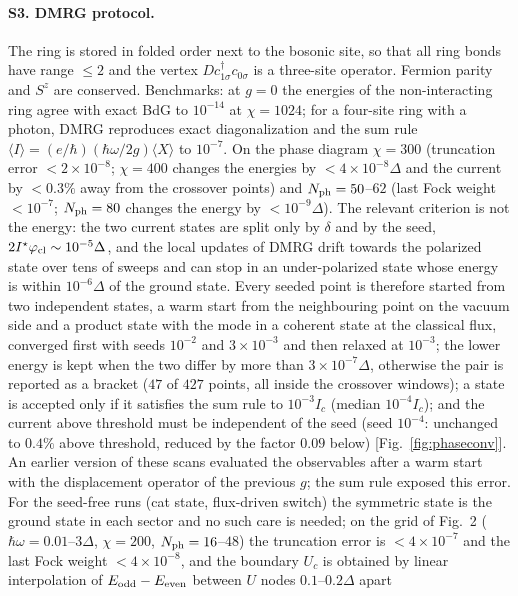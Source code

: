 \paragraph*{S3. DMRG protocol.}
The ring is stored in folded order next to the bosonic site, so that all ring bonds have range $\le2$
and the vertex $Dc^\dagger_{1\sigma}c_{0\sigma}$ is a three-site operator. Fermion parity and $S^z$ are
conserved. Benchmarks: at $g=0$ the energies of the non-interacting ring agree with exact BdG to
$10^{-14}$ at $\chi=1024$; for a four-site ring with a photon, DMRG reproduces exact diagonalization and the
sum rule $\langle I\rangle=(e/\hbar)(\hbar\omega/2g)\langle X\rangle$ to $10^{-7}$. On the phase diagram
$\chi=300$ (truncation error $<2\times10^{-8}$; $\chi=400$ changes the energies by $<4\times10^{-8}\Delta$ and
the current by $<0.3\%$ away from the crossover points) and $N_{\rm ph}=50$--$62$ (last Fock weight
$<10^{-7}$; $N_{\rm ph}=80$ changes the energy by $<10^{-9}\Delta$). The relevant criterion is not the energy:
the two current states are split only by $\delta$ and by the seed, $2I^\star\varphi_{\rm cl}\sim10^{-5}\Delta$,
and the local updates of DMRG drift towards the polarized state over tens of sweeps and can stop in an
under-polarized state whose energy is within $10^{-6}\Delta$ of the ground state. Every seeded point is
therefore started from two independent states, a warm start from the neighbouring point on the vacuum side
and a product state with the mode in a coherent state at the classical flux, converged first with seeds
$10^{-2}$ and $3\times10^{-3}$ and then relaxed at $10^{-3}$; the lower energy is kept when the two differ by
more than $3\times10^{-7}\Delta$, otherwise the pair is reported as a bracket ($47$ of $427$ points, all inside
the crossover windows); a state is accepted only if it satisfies the sum rule to $10^{-3}I_c$ (median
$10^{-4}I_c$); and the current above threshold must be independent of the seed (seed $10^{-4}$: unchanged to
$0.4\%$ above threshold, reduced by the factor $0.09$ below) [Fig.~\ref{fig:phaseconv}]. An earlier version
of these scans evaluated the observables after a warm start with the displacement operator of the previous
$g$; the sum rule exposed this error. For the seed-free runs (cat state, flux-driven switch) the symmetric
state is the ground state in each sector and no such care is needed; on the grid of Fig.~2 ($\hbar\omega=0.01$--$3\Delta$, $\chi=200$,
$N_{\rm ph}=16$--$48$) the truncation error is $<4\times10^{-7}$ and the last Fock weight $<4\times10^{-8}$, and the
boundary $U_c$ is obtained by linear interpolation of $E_{\rm odd}-E_{\rm even}$ between $U$ nodes $0.1$--$0.2\Delta$ apart
